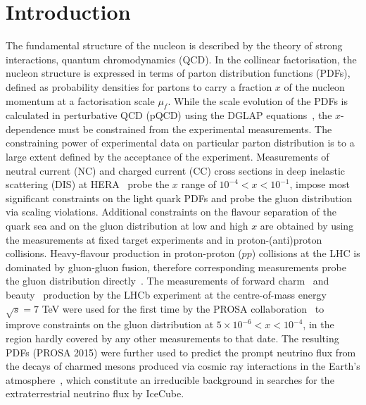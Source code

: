 \section{Introduction}
\label{sect:intro}

The fundamental structure of the nucleon is described by the theory of strong interactions, quantum chromodynamics (QCD).
In the collinear factorisation, the nucleon structure is expressed in terms of parton distribution functions (PDFs), defined 
as probability densities for partons to carry a fraction $x$ of the nucleon momentum at a factorisation scale $\mu_f$. While the 
scale evolution of the PDFs is calculated in perturbative QCD (pQCD) using the DGLAP equations~\cite{Dokshitzer:1977sg,Gribov:1972ri,Altarelli:1977zs,Curci:1980uw,Furmanski:1980cm,Moch:2004pa,Vogt:2004mw}, the 
$x$-dependence must be constrained from the experimental measurements. The constraining power of experimental data 
on particular parton distribution is to a large extent defined by the acceptance of the experiment. Measurements of 
neutral current (NC) and charged current (CC) cross sections in deep inelastic scattering (DIS) at HERA~\cite{Abramowicz:2015mha} probe the $x$ range of $10^{-4}<x<10^{-1}$, impose most significant constraints on the light quark PDFs and probe the gluon distribution via scaling violations. Additional constraints on the flavour separation of the quark sea and on the gluon distribution at low and high $x$ are obtained by using the measurements at fixed target experiments and in proton-(anti)proton collisions. 
Heavy-flavour production in proton-proton ($pp$) collisions at the LHC is dominated by gluon-gluon fusion, therefore corresponding measurements probe the gluon distribution directly~\cite{Zenaiev:2015rfa,Gauld:2015yia,Gauld:2016kpd,Bertone:2018dse}. 
The measurements of forward charm~\cite{Aaij:2013mga} and beauty~\cite{Aaij:2013noa} production by the LHCb experiment at the centre-of-mass energy $\sqrt{s}=7$ TeV were used for the first time by the PROSA collaboration~\cite{Zenaiev:2015rfa} to improve constraints on the gluon distribution at $5 \times 10^{-6}< x < 10^{-4}$, in the region hardly covered by any other measurements to that date. 
The resulting PDFs (PROSA 2015) were further used to predict the prompt neutrino flux from the decays of charmed mesons produced via cosmic ray interactions in the Earth's atmosphere~\cite{Garzelli:2016xmx}, which constitute an irreducible background in searches for the extraterrestrial neutrino flux by IceCube. 
